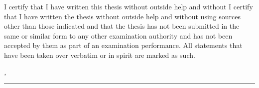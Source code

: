 %
\label{sec:declaration}
\thispagestyle{empty}

I certify that I have written this thesis without outside help and without
I certify that I have written the thesis without outside help and without using sources other than those indicated and that the thesis has not been submitted in the same or similar form to any other examination authority and has not been accepted by them as part of an examination performance. All statements that have been taken over verbatim or in spirit are marked as such.

\bigskip

\noindent\textit{\thesisUniversityCity, \thesisDate}

\smallskip

\begin{flushright}
	\begin{minipage}{5cm}
		\rule{\textwidth}{1pt}
		\centering\thesisName
	\end{minipage}
\end{flushright}

